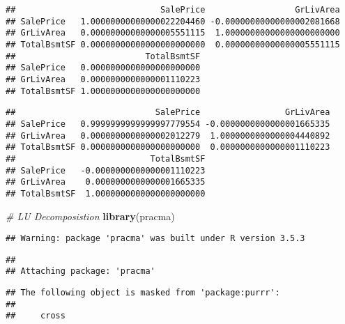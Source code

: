 \documentclass[]{article}
\newenvironment{Shaded}{\begin{snugshade}}{\end{snugshade}}
\newcommand{\KeywordTok}[1]{\textcolor[rgb]{0.13,0.29,0.53}{\textbf{#1}}}
\newcommand{\StringTok}[1]{\textcolor[rgb]{0.31,0.60,0.02}{#1}}
\newcommand{\CommentTok}[1]{\textcolor[rgb]{0.56,0.35,0.01}{\textit{#1}}}
\newcommand{\OperatorTok}[1]{\textcolor[rgb]{0.81,0.36,0.00}{\textbf{#1}}}
\newcommand{\NormalTok}[1]{#1}
\begin{document}
\begin{verbatim}
##                             SalePrice                  GrLivArea
## SalePrice   1.00000000000000022204460 -0.00000000000000002081668
## GrLivArea   0.00000000000000005551115  1.00000000000000000000000
## TotalBsmtSF 0.00000000000000000000000  0.00000000000000005551115
##                          TotalBsmtSF
## SalePrice   0.0000000000000000000000
## GrLivArea   0.0000000000000001110223
## TotalBsmtSF 1.0000000000000000000000
\end{verbatim}

\begin{Shaded}
\end{Shaded}

\begin{verbatim}
##                            SalePrice                 GrLivArea
## SalePrice   0.9999999999999997779554 -0.0000000000000001665335
## GrLivArea   0.0000000000000002012279  1.0000000000000004440892
## TotalBsmtSF 0.0000000000000000000000  0.0000000000000001110223
##                           TotalBsmtSF
## SalePrice   -0.0000000000000001110223
## GrLivArea    0.0000000000000001665335
## TotalBsmtSF  1.0000000000000000000000
\end{verbatim}

\begin{Shaded}
\begin{Highlighting}[]
\CommentTok{# LU Decomposistion}
\KeywordTok{library}\NormalTok{(pracma)}
\end{Highlighting}
\end{Shaded}

\begin{verbatim}
## Warning: package 'pracma' was built under R version 3.5.3
\end{verbatim}

\begin{verbatim}
## 
## Attaching package: 'pracma'
\end{verbatim}

\begin{verbatim}
## The following object is masked from 'package:purrr':
## 
##     cross
\end{verbatim}
\end{document}
